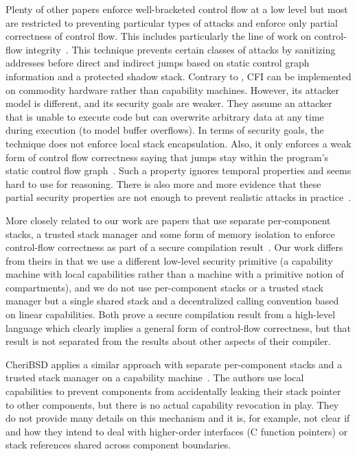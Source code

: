 \documentclass[acmsmall,screen]{acmart}\settopmatter{}
\begin{document}
Plenty of other papers enforce well-bracketed control flow at a low level but most are restricted to preventing particular types of attacks and enforce only partial correctness of control flow.
This includes particularly the line of work on control-flow integrity~\citep{abadi_control-flow_2005}.
This technique prevents certain classes of attacks by sanitizing addresses before direct and indirect jumps based on static control graph information and a protected shadow stack.
Contrary to \stktokens{}, CFI can be implemented on commodity hardware rather than capability machines.
However, its attacker model is different, and its security goals are weaker.
They assume an attacker that is unable to execute code but can overwrite arbitrary data at any time during execution (to model buffer overflows).
In terms of security goals, the technique does not enforce local stack encapsulation.
Also, it only enforces a weak form of control flow correctness saying that jumps stay within the program's static control flow graph~\cite{Abadi2005Theory}.
Such a property ignores temporal properties and seems hard to use for reasoning.
There is also more and more evidence that these partial security properties are not enough to prevent realistic attacks in practice~\citep{Evans:2015:CJW:2810103.2813646,Carlini2015ControlFlowBending}.

More closely related to our work are papers that use separate per-component stacks, a trusted stack manager and some form of memory isolation to enforce control-flow correctness as part of a secure compilation result~\citep{patrignani_modular_2016,juglaret_beyond_2016}.
Our work differs from theirs in that we use a different low-level security primitive (a capability machine with local capabilities rather than a machine with a primitive notion of compartments), and we do not use per-component stacks or a trusted stack manager but a single shared stack and a decentralized calling convention based on linear capabilities.
Both prove a secure compilation result from a high-level language which clearly implies a general form of control-flow correctness, but that result is not separated from the results about other aspects of their compiler.

CheriBSD applies a similar approach with separate per-component stacks and a trusted stack manager on a capability machine~\cite{watson_cheri_2015}.
The authors use local capabilities to prevent components from accidentally leaking their stack pointer to other components, but there is no actual capability revocation in play.
They do not provide many details on this mechanism and it is, for example, not clear if and how they intend to deal with higher-order interfaces (C function pointers) or stack references shared across component boundaries. 
\end{document}
